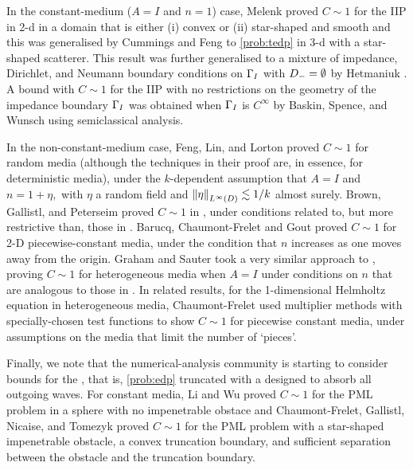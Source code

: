 In the constant-medium ($A=I$ and $n=1$) case, Melenk \cite{Me:95} proved $C\sim 1$ for the IIP in 2-d in a domain that is either (i) convex or (ii) star-shaped and smooth and this was generalised by Cummings and Feng \cite{CuFe:06} to \cref{prob:tedp} in 3-d with a star-shaped scatterer. This result was further generalised to a mixture of impedance, Dirichlet, and Neumann boundary conditions on $\Gamma_{I}$ with $D_{-}=\emptyset$ by Hetmaniuk \cite{He:07}. A bound with $C \sim 1$ for the IIP with no restrictions on the geometry of the impedance boundary $\Gamma_{I}$ was obtained when $\Gamma_{I}$ is $C^\infty$ by Baskin, Spence, and Wunsch \cite{BaSpWu:16} using semiclassical analysis.

In the non-constant-medium case, Feng, Lin, and Lorton \cite{FeLiLo:15} proved $C \sim 1$ for random media (although the techniques in their proof are, in essence, for deterministic media), under the $k$-dependent assumption that $A=I$ and $n = 1 + \eta,$ with $\eta$ a random field and $\NLiD{\eta} \lesssim 1/k$ almost surely. Brown, Gallistl, and Peterseim proved $C \sim 1$ in \cite{BrGaPe:17}, under conditions related to, but more restrictive than, those in \cite{GrPeSp:19}. Barucq, Chaumont-Frelet and Gout \cite{BaChGo:17} proved $C \sim 1$ for 2-D piecewise-constant media, under the condition that $n$ increases as one moves away from the origin.  Graham and Sauter \cite{GrSa:18} took a very similar approach to \cite{GrPeSp:19}, proving $C \sim 1$ for heterogeneous media when $A=I$ under conditions on $n$ that are analogous to those in \cite{GrPeSp:19}. In related results, for the 1-dimensional Helmholtz equation in heterogeneous media, Chaumont-Frelet \cite[Section 2.1.5, Theorem 3]{Ch:15} used multiplier methods with specially-chosen test functions to show $C \sim 1$ for piecewise constant media, under assumptions on the media that limit the number of `pieces'.

Finally, we note that the numerical-analysis community is starting to consider bounds for the , that is, \cref{prob:edp} truncated with a  designed to absorb all outgoing waves. For constant media, Li and Wu \cite{LiWu:18} proved $C \sim 1$ for the PML problem in a sphere with no impenetrable obstace and Chaumont-Frelet, Gallistl, Nicaise, and Tomezyk proved $C \sim 1$ for the PML problem with a star-shaped impenetrable obstacle, a convex truncation boundary, and sufficient separation between the obstacle and the truncation boundary.

